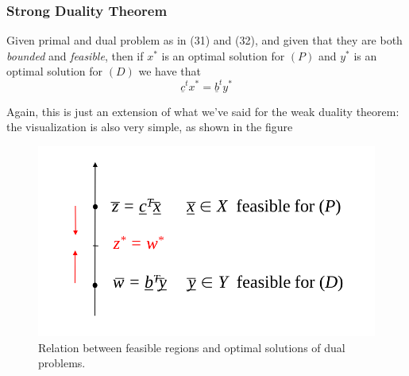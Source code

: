         \subsubsection{Strong Duality Theorem}
            Given primal and dual problem as in (31) and (32), and given that they are both \textit{bounded} and \textit{feasible}, then if $x^*$ is an optimal solution for $(P)$ and $y^*$ is an optimal solution for $(D)$ we have that
            \begin{equation} \underline{c}^tx^* = \underline{b}^ty^* \end{equation}
            \begin{minipage}{0.5\linewidth}
                Again, this is just an extension of what we've said for the weak duality theorem: the visualization is also very simple, as shown in the figure
            \end{minipage}
            \begin{minipage}{0.5\linewidth}
                \begin{figure}[H]
                    \centering
                    \includegraphics[width = \textwidth]{./images/Duality1.png}
                    \caption{Relation between feasible regions and optimal solutions of dual problems.}
                \end{figure}
            \end{minipage}
            \vspace{0.5cm}
            
